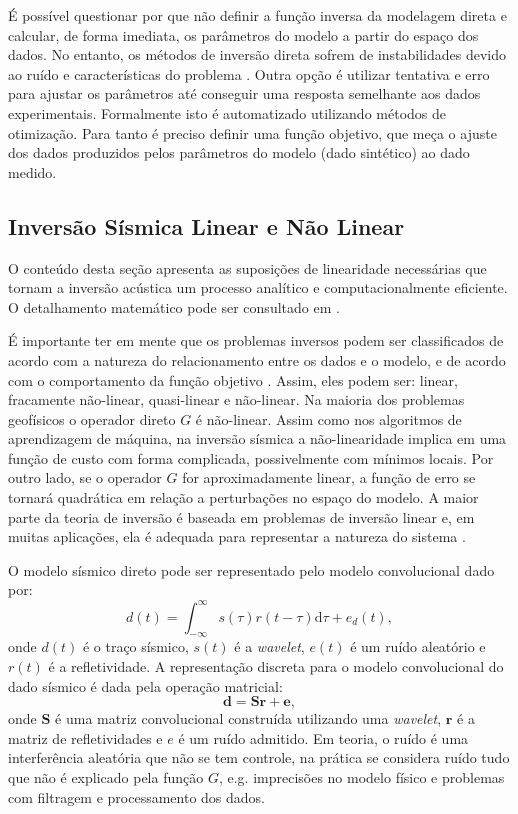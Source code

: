 É possível questionar por que não definir a
função inversa da modelagem direta e calcular, de forma imediata,
os parâmetros do modelo a partir do espaço dos dados.
No entanto, os métodos de inversão direta sofrem de instabilidades
devido ao ruído e características do problema \citep[p. 50]{sen_livro}. Outra
opção é utilizar tentativa e erro para ajustar os parâmetros até conseguir uma
resposta semelhante aos dados experimentais. Formalmente isto é automatizado
utilizando métodos de otimização. Para tanto é preciso definir uma função
objetivo, que meça o ajuste dos dados produzidos pelos
parâmetros do modelo (dado sintético) ao dado medido.

\subsection{Inversão Sísmica Linear e Não Linear}
O conteúdo desta seção apresenta as suposições de linearidade necessárias
que tornam a inversão acústica um processo analítico e computacionalmente
eficiente. O detalhamento matemático pode ser consultado em \cite{leandroGRSL,Figueiredo17}.

É importante ter em mente
que os problemas inversos podem ser classificados de acordo com a natureza
do relacionamento entre os dados e o modelo, e de acordo com o comportamento da função objetivo \citep{sen_livro}.
Assim, eles podem ser: linear, fracamente não-linear, quasi-linear e não-linear.
Na maioria dos problemas geofísicos o operador direto $G$ é não-linear.
Assim como nos algoritmos de aprendizagem de máquina, na inversão sísmica
a não-linearidade implica em uma função de custo com forma complicada,
possivelmente com mínimos locais.
Por outro lado, se o operador $G$ for aproximadamente linear, a
função de erro se tornará quadrática em relação a perturbações
no espaço do modelo. A maior parte da teoria de inversão é baseada em problemas
de inversão linear e, em muitas aplicações, ela é 
adequada para representar a natureza do sistema \cite{sen_livro}.

O modelo sísmico direto pode ser representado pelo modelo convolucional dado por:
\begin{equation}
d(t) = \int_{-\infty}^{\infty} s(\tau) r(t - \tau)\mathrm{d}\tau + e_{d}(t),
\label{eq:conmodel}
\end{equation}
onde $d(t)$ é o traço sísmico, $s(t)$ é a \textit{wavelet}, $e(t)$ é
um ruído aleatório e $r(t)$ é a refletividade.
A representação discreta para o modelo convolucional do dado sísmico é
dada pela operação matricial: 
\begin{equation}
\label{eq:sismDiscreta}
\mathbf{d = Sr + e},
\end{equation}
onde $\mathbf{S}$ é uma matriz convolucional construída utilizando uma
\textit{wavelet}, $\mathbf{r}$ é a matriz de refletividades e $e$ é um
ruído admitido. Em teoria, o ruído é uma interferência aleatória que não se tem
controle, na prática se considera ruído tudo que não é explicado pela função
$G$, e.g. imprecisões no modelo físico e problemas com filtragem e processamento
dos dados.

